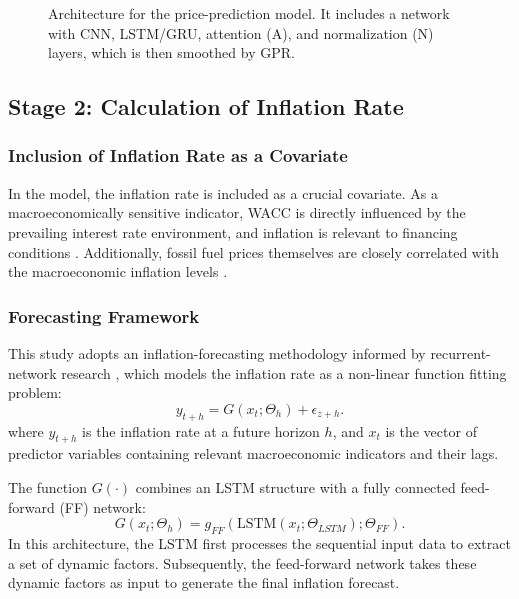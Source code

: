 \begin{figure}[t]
    \centering
    \caption{Architecture for the price-prediction model. It includes a network with CNN, LSTM/GRU, attention (A), and normalization (N) layers, which is then smoothed by GPR.}
    \label{fig:lstm}
\end{figure}

\subsection{Stage 2: Calculation of Inflation Rate}

\subsubsection{Inclusion of Inflation Rate as a Covariate}
In the model, the inflation rate is included as a crucial covariate. As a macroeconomically sensitive indicator, WACC is directly influenced by the prevailing interest rate environment, and inflation is relevant to financing conditions \cite{dobrowolski2022weighted}. Additionally, fossil fuel prices themselves are closely correlated with the macroeconomic inflation levels \cite{millischer2024renewables}.

\subsubsection{Forecasting Framework}
This study adopts an inflation-forecasting methodology informed by recurrent-network research \cite{PARANHOS2025}, which models the inflation rate as a non-linear function fitting problem:
\begin{equation}
y_{t+h}=G(x_t;\Theta_h)+\epsilon_{z+h}.
\end{equation}
where $y_{t+h}$ is the inflation rate at a future horizon $h$, and $x_t$ is the vector of predictor variables containing relevant macroeconomic indicators and their lags.

The function $G(\cdot)$ combines an LSTM structure with a fully connected feed-forward (FF) network:
\begin{equation}
G(x_t;\Theta_h)=g_{FF}(\mathrm{LSTM}(x_t;\Theta_{LSTM});\Theta_{FF}).
\end{equation}
In this architecture, the LSTM first processes the sequential input data to extract a set of dynamic factors. Subsequently, the feed-forward network takes these dynamic factors as input to generate the final inflation forecast.

